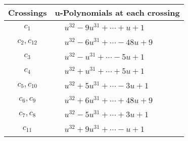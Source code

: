 \documentclass[1p]{elsarticle_modified}
\theoremstyle{definition}
\begin{document}
\begin{tabular}{m{50pt}|m{274pt}}
Crossings & \hspace{64pt}u-Polynomials at each crossing \\
\hline $$\begin{aligned}c_{1}\end{aligned}$$&$\begin{aligned}
&u^{32}-9 u^{31}+\cdots+u+1
\end{aligned}$\\
\hline $$\begin{aligned}c_{2},c_{12}\end{aligned}$$&$\begin{aligned}
&u^{32}-6 u^{31}+\cdots-48 u+9
\end{aligned}$\\
\hline $$\begin{aligned}c_{3}\end{aligned}$$&$\begin{aligned}
&u^{32}- u^{31}+\cdots-5 u+1
\end{aligned}$\\
\hline $$\begin{aligned}c_{4}\end{aligned}$$&$\begin{aligned}
&u^{32}+u^{31}+\cdots+5 u+1
\end{aligned}$\\
\hline $$\begin{aligned}c_{5},c_{10}\end{aligned}$$&$\begin{aligned}
&u^{32}+5 u^{31}+\cdots-3 u+1
\end{aligned}$\\
\hline $$\begin{aligned}c_{6},c_{9}\end{aligned}$$&$\begin{aligned}
&u^{32}+6 u^{31}+\cdots+48 u+9
\end{aligned}$\\
\hline $$\begin{aligned}c_{7},c_{8}\end{aligned}$$&$\begin{aligned}
&u^{32}-5 u^{31}+\cdots+3 u+1
\end{aligned}$\\
\hline $$\begin{aligned}c_{11}\end{aligned}$$&$\begin{aligned}
&u^{32}+9 u^{31}+\cdots- u+1
\end{aligned}$\\
\hline
\end{tabular}\\~\\
\end{document}
